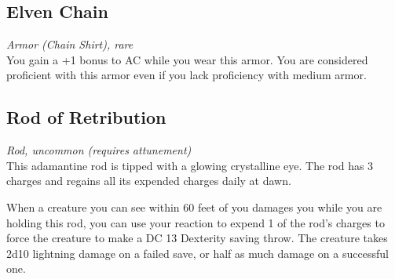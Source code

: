 \documentclass[letterpaper,openany,oneside,twocolumn]{book}
\begin{document}
\subsection*{Elven Chain}
\textit{Armor (Chain Shirt), rare}\\
You gain a +1 bonus to AC while you wear this armor. You are considered proficient with this armor even if you lack proficiency with medium armor.

\subsection*{Rod of Retribution}
\textit{Rod, uncommon (requires attunement)}\\
This adamantine rod is tipped with a glowing crystalline eye. The rod has 3 charges and regains all its expended charges daily at dawn.

When a creature you can see within 60 feet of you damages you while you are holding this rod, you can use your reaction to expend 1 of the rod's charges to force the creature to make a DC 13 Dexterity saving throw. The creature takes 2d10 lightning damage on a failed save, or half as much damage on a successful one.
\end{document}
